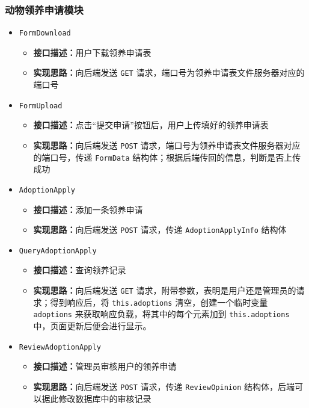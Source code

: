 \documentclass[12pt,a4paper,UTF8]{article}
\begin{document}
\subsubsection{动物领养申请模块}

\begin{itemize}

  \item \verb|FormDownload|
  \begin{itemize}
  \item \textbf{接口描述：}用户下载领养申请表
  \item \textbf{实现思路：}向后端发送 \verb|GET| 请求，端口号为领养申请表文件服务器对应的端口号
  \end{itemize}

  \item \verb|FormUpload|
  \begin{itemize}
  \item \textbf{接口描述：}点击“提交申请”按钮后，用户上传填好的领养申请表
  \item \textbf{实现思路：}向后端发送 \verb|POST| 请求，端口号为领养申请表文件服务器对应的端口号，传递 \verb|FormData| 结构体；根据后端传回的信息，判断是否上传成功
  \end{itemize}

  \item \verb|AdoptionApply|
  \begin{itemize}
  \item \textbf{接口描述：}添加一条领养申请
  \item \textbf{实现思路：}向后端发送 \verb|POST| 请求，传递 \verb|AdoptionApplyInfo| 结构体
  \end{itemize}

  \item \verb|QueryAdoptionApply|
  \begin{itemize}
  \item \textbf{接口描述：}查询领养记录
  \item \textbf{实现思路：}向后端发送 \verb|GET| 请求，附带参数，表明是用户还是管理员的请求；得到响应后，将 \verb|this.adoptions| 清空，创建一个临时变量 \verb|adoptions| 来获取响应负载，将其中的每个元素加到 \verb|this.adoptions| 中，页面更新后便会进行显示。
  \end{itemize}
  
  \item \verb|ReviewAdoptionApply|
  \begin{itemize}
  \item \textbf{接口描述：}管理员审核用户的领养申请
  \item \textbf{实现思路：}向后端发送 \verb|POST| 请求，传递 \verb|ReviewOpinion| 结构体，后端可以据此修改数据库中的审核记录
  \end{itemize}


\end{itemize}
\end{document}
